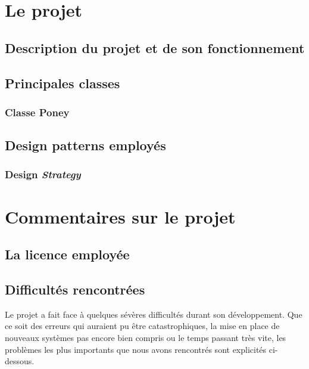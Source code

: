 \documentclass{article}
\newcommand{\pattern}{\emph}
\begin{document}
\section{Le projet}
    
    
    \subsection{Description du projet et de son fonctionnement}

    \subsection{Principales classes}

        \subsubsection{Classe Poney}

    \subsection{Design patterns employés}

        \subsubsection{Design \pattern{Strategy}}
        
\section{Commentaires sur le projet}

    \subsection{La licence employée}
    
    
    
    \subsection{Difficultés rencontrées}
    
    Le projet a fait face à quelques sévères difficultés durant son développement. Que ce soit des erreurs qui auraient pu être catastrophiques, la mise en place de nouveaux systèmes pas encore bien compris ou le temps passant très vite, les problèmes les plus importants que nous avons rencontrés sont explicités ci-dessous.
    
\end{document}

